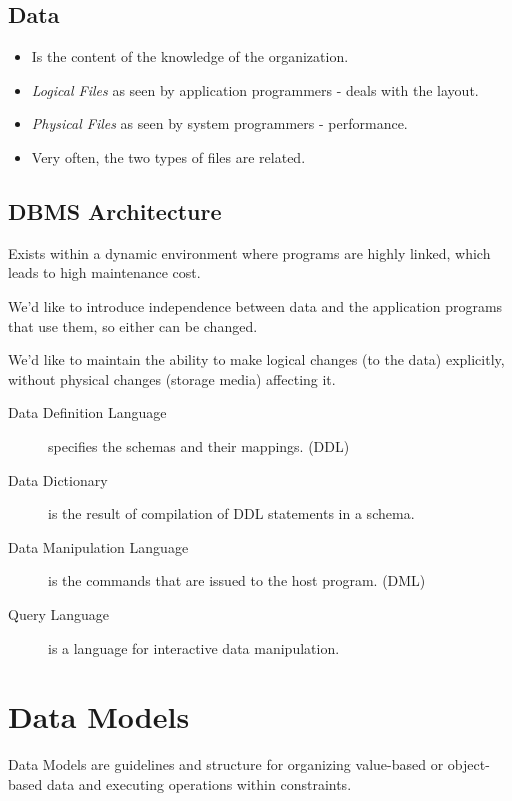             \section{Data} %
            \label{sec:data}
                \begin{itemize}
                    \item Is the content of the knowledge of the organization.
                    \item \emph{Logical Files} as seen by application programmers - deals with the layout.
                    \item \emph{Physical Files} as seen by system programmers - performance.
                    \item Very often, the two types of files are related.
                \end{itemize}
            \section{DBMS Architecture} %
            \label{sec:dbms_architecture}
                Exists within a dynamic environment where programs are highly linked, which leads to high maintenance cost.

                We'd like to introduce independence between data and the application programs that use them, so either can be changed.

                We'd like to maintain the ability to make logical changes (to the data) explicitly, without physical changes (storage media) affecting it.

                \begin{description}
                    \item[Data Definition Language]  specifies the schemas and their mappings. (DDL)
                    \item[Data Dictionary] is the result of compilation of DDL statements in a schema.
                    \item[Data Manipulation Language] is the commands that are issued to the host program. (DML)
                    \item[Query Language] is a language for interactive data manipulation.
                \end{description}

        \chapter{Data Models} %
        \label{cha:data_models}
            Data Models are guidelines and structure for organizing value-based or object-based data and executing operations within constraints.

